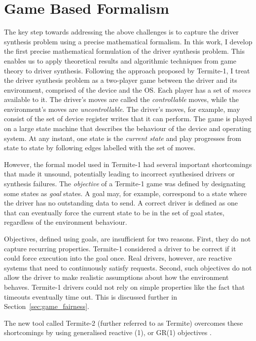 \section{Game Based Formalism}

The key step towards addressing the above challenges is to capture the driver synthesis problem using a precise mathematical formalism.  In this work, I develop the first precise mathematical formulation of the driver synthesis problem.  This enables us to apply theoretical results and algorithmic techniques from game theory to driver synthesis.  Following the approach proposed by Termite-1, I treat the driver synthesis problem as a two-player game between the driver and its environment, comprised of the device and the OS\@. Each player has a set of \emph{moves} available to it. The driver's moves are called the \emph{controllable} moves, while the environment's moves are \emph{uncontrollable}. The driver's moves, for example, may consist of the set of device register writes that it can perform. The game is played on a large state machine that describes the behaviour of the device and operating system. At any instant, one state is the \emph{current state} and play progresses from state to state by following edges labelled with the set of moves. 

However, the formal model used in Termite-1 had several important shortcomings that made it unsound, potentially leading to incorrect synthesised drivers or synthesis failures.  The \emph{objective} of a Termite-1 game was defined by designating some states as \emph{goal} states. A goal may, for example, correspond to a state where the driver has no outstanding data to send. A correct driver is defined as one that can eventually force the current state to be in the set of goal states, regardless of the environment behaviour. 

Objectives, defined using goals, are insufficient for two reasons. First, they do not capture recurring properties. Termite-1 considered a driver to be correct if it could force execution into the goal once. Real drivers, however, are reactive systems that need to continuously satisfy requests. Second, such objectives do not allow the driver to make realistic assumptions about how the environment behaves. Termite-1 drivers could not rely on simple properties like the fact that timeouts eventually time out. This is discussed further in Section~\ref{sec:game_fairness}. 

The new tool called Termite-2 (further referred to as Termite) overcomes these shortcomings by using generalised reactive (1), or GR(1) objectives \cite{Piterman_PS_06}.

